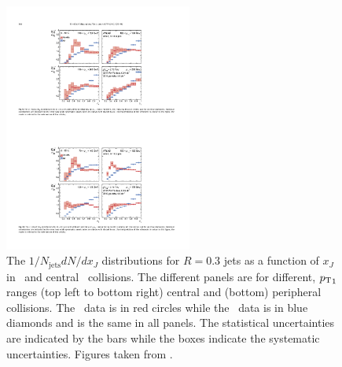 \begin{figure}[htbp]
\begin{center}
\includegraphics[width=0.55\textwidth]{figures/jetMeasurements/xJ_R03}
\caption{The $1/N_\mathrm{jets} dN/dx_J$ distributions for $R=0.3$ jets as a function of $x_J$ in \pp\ and central \pbpb\ collisions.
The different panels are for different, $\mbox{$p_{\mathrm{T}}$}_1$ ranges (top left to bottom right) central and (bottom) peripheral collisions.
The \pbpb\ data is in red circles while the \pp\ data is in blue diamonds and is the same in all panels.
The statistical uncertainties are indicated by the bars while the boxes indicate the systematic uncertainties.
Figures taken from \cite{Aaboud:2017eww}.}
\label{fig:xJ_R03}
\end{center}
\end{figure}


